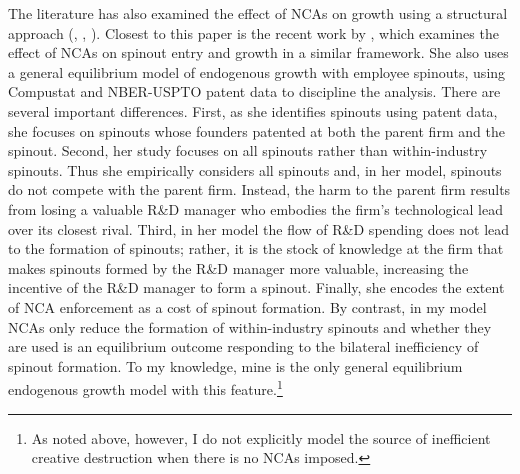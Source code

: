 \documentclass[ecta,nameyear,final]{econsocart}
\theoremstyle{plain}
\theoremstyle{remark}
\begin{document}
The literature has also examined the effect of NCAs on growth using a structural approach (\cite{franco_covenants_2008}, \cite{shi_restrictions_2018}, \cite{baslandze_spinout_2019}). Closest to this paper is the recent work by \cite{baslandze_spinout_2019}, which examines the effect of NCAs on spinout entry and growth in a similar framework. She also uses a general equilibrium model of endogenous growth with employee spinouts, using Compustat and NBER-USPTO patent data to discipline the analysis. There are several important differences. First, as she identifies spinouts using patent data, she focuses on spinouts whose founders patented at both the parent firm and the spinout. Second, her study focuses on all spinouts rather than within-industry spinouts. Thus she empirically considers all spinouts and, in her model, spinouts do not compete with the parent firm. Instead, the harm to the parent firm results from losing a valuable R\&D manager who embodies the firm's technological lead over its closest rival. Third, in her model the flow of R\&D spending does not lead to the formation of spinouts; rather, it is the stock of knowledge at the firm that makes spinouts formed by the R\&D manager more valuable, increasing the incentive of the R\&D manager to form a spinout. Finally, she encodes the extent of NCA enforcement as a cost of spinout formation. By contrast, in my model NCAs only reduce the formation of within-industry spinouts and whether they are used is an equilibrium outcome responding to the bilateral inefficiency of spinout formation. To my knowledge, mine is the only general equilibrium endogenous growth model with this feature.\footnote{As noted above, however, I do not explicitly model the source of inefficient creative destruction when there is no NCAs imposed.}  
\end{document}
